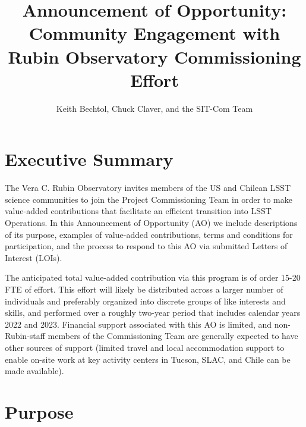 \documentclass[SE,authoryear,toc]{lsstdoc}
\title{Announcement of Opportunity: Community Engagement with Rubin Observatory Commissioning Effort}
\author{%
Keith Bechtol, Chuck Claver, and the SIT-Com Team
}
\date{\vcsDate}
\begin{document}
\maketitle


\section{Executive Summary}

The Vera C. Rubin Observatory invites members of the US and Chilean LSST science communities to join the Project Commissioning Team in order to make value-added contributions that facilitate an efficient transition into LSST Operations. In this Announcement of Opportunity (AO) we include descriptions of its purpose, examples of value-added contributions, terms and conditions for participation, and the process to respond to this AO via submitted Letters of Interest (LOIs).

The anticipated total value-added contribution via this program is of order 15-20 FTE of effort. This effort will likely be distributed across a larger number of individuals and preferably organized into discrete groups of like interests and skills, and performed over a roughly two-year period that includes calendar years 2022 and 2023. Financial support associated with this AO is limited, and non-Rubin-staff members of the Commissioning Team are generally expected to have other sources of support (limited travel and local accommodation support to enable on-site work at key activity centers in Tucson, SLAC, and Chile can be made available).

\section{Purpose}
\label{purpose}
\end{document}
